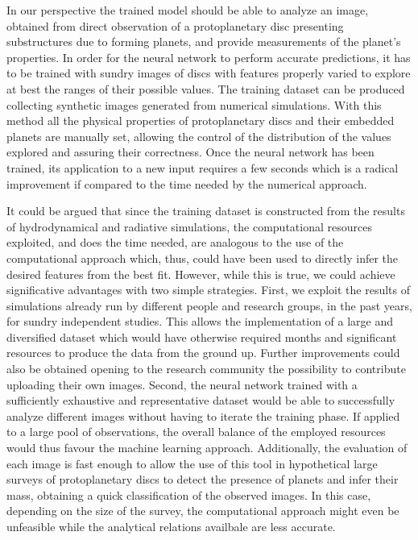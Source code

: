 \documentclass[a4paper,10pt]{report}
\begin{document}
In our perspective the trained model should be able to analyze an image, obtained from direct observation of a protoplanetary disc
presenting substructures due to forming planets, and provide measurements of the planet's properties.
In order for the neural network to perform accurate predictions, it has to be trained with sundry images of discs with
features properly varied to explore at best the ranges of their possible values. 
The training dataset can be produced collecting synthetic images generated from numerical simulations. With this method
all the physical properties of protoplanetary discs and their embedded planets are manually set, allowing the control of the 
distribution of the values explored and assuring their correctness.
Once the neural network has been trained, its application to a new input requires a few seconds which is a radical improvement
if compared to the time needed by the numerical approach.

It could be argued that since the training dataset is constructed from the results of hydrodynamical and radiative simulations,
the computational resources exploited, and does the time needed, are analogous to the use of the computational approach
which, thus, could have been used to
directly infer the desired features from the best fit. However, while this is true, we could achieve significative
advantages with two simple strategies.
First, we exploit the results of simulations already run by different people and research groups, in the past years,
for sundry independent studies. This allows the implementation of a large and diversified dataset which would have
otherwise required months and significant resources to produce the data from the ground up. Further improvements could also be obtained opening 
to the research community the possibility to contribute
uploading their own images.
Second, the neural network trained with a sufficiently exhaustive and representative dataset would be able to
successfully analyze different images without having to iterate the training phase. If applied to a large pool of observations,
the overall balance of the employed resources
would thus favour the machine learning approach. Additionally, the evaluation of each image is fast enough to allow 
the use of this tool in hypothetical large surveys of protoplanetary discs to detect the presence of planets
and infer their mass, obtaining a quick classification of the observed images. In this case, depending on the size of the survey,
the computational approach might even be unfeasible while the analytical relations availbale are less accurate.
\end{document}
